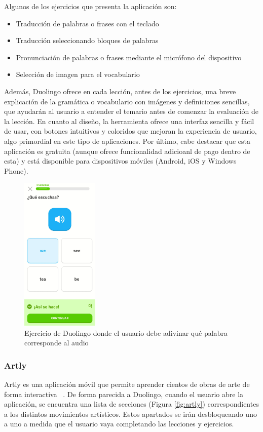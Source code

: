 Algunos de los ejercicios que presenta la aplicación son:
\begin{itemize}
    \item Traducción de palabras o frases con el teclado
    \item Traducción seleccionando bloques de palabras
    \item Pronunciación de palabras o frases mediante el micrófono del dispositivo
    \item Selección de imagen para el vocabulario
\end {itemize}
    Además, Duolingo ofrece en cada lección, antes de los ejercicios, una breve explicación de la gramática o vocabulario con
imágenes y definiciones sencillas, que ayudarán al usuario a entender el temario antes de comenzar la evaluación de la lección.
En cuanto al diseño, la herramienta ofrece una interfaz sencilla y fácil de usar, con botones intuitivos y coloridos que mejoran
la experiencia de usuario, algo primordial en este tipo de aplicaciones.
Por último, cabe destacar que esta aplicación es gratuita (aunque ofrece funcionalidad adicioanl de pago dentro de esta) y está disponible para dispositivos móviles (Android, iOS y Windows Phone).
\begin{figure}[H]
    \centering
    \includegraphics[width=0.33\textwidth]{imagenes/c2/duolingo.jpeg}
    \caption{Ejercicio de Duolingo donde el usuario debe adivinar qué palabra corresponde al audio}
    \label{fig:duolingo}
\end{figure} 


\subsubsection{Artly}
Artly es una aplicación móvil que permite aprender cientos de obras de arte de forma interactiva ~\cite{artly}. De forma parecida a Duolingo, 
cuando el usuario abre la aplicación, se encuentra una lista de secciones (Figura \ref{fig:artly}) correspondientes a los distintos movimientos 
artísticos. Estos apartados se irán desbloqueando uno a uno a medida que el usuario vaya completando las lecciones y ejercicios.
 
